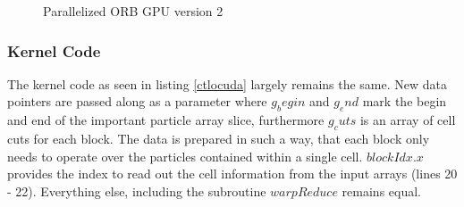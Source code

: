 \documentclass[]{article}
\begin{document}
\begin{figure}[H]
	\begin{center}
	\end{center}
	\caption{Parallelized ORB GPU version 2}
	\label{fig:orbgpup2}
\end{figure}


\subsubsection{Kernel Code}

The kernel code as seen in listing \ref{ctlocuda} largely remains the same. New data pointers are passed along as a parameter where $g_begin$ and $g_end$ mark the begin and end of the important particle array slice, furthermore $g_cuts$ is an array of cell cuts for each block. The data is prepared in such a way, that each block only needs to operate over the particles contained within a single cell. $blockIdx.x$ provides the index to read out the cell information from the input arrays (lines 20 - 22). Everything else, including the subroutine $warpReduce$ remains equal. 
\end{document}

